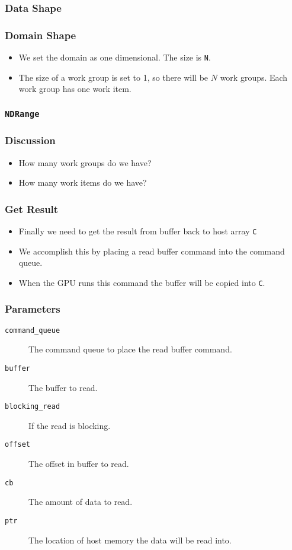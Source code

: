 \documentclass{beamer}
\begin{document}
\begin{frame}
  \frametitle{Data Shape}
\end{frame}

\begin{frame}
  \frametitle{Domain Shape}
  \begin{itemize}
  \item We set the domain as one dimensional.  The size is {\tt N}.
  \item The size of a work group is set to 1, so there will be $N$
    work groups.  Each work group has one work item.
  \end{itemize}
\end{frame}

\begin{frame}
  \frametitle{\tt NDRange}
  \centerline{}
\end{frame}

\begin{frame}
  \frametitle{Discussion}
  \begin{itemize}
    \item How many work groups do we have?
    \item How many work items do we have?
  \end{itemize}
\end{frame}

\begin{frame}
  \frametitle{Get Result}
  \begin{itemize}
  \item Finally we need to get the result from buffer back to host
    array {\tt C}
  \item We accomplish this by placing a read buffer command into the
    command queue.  
  \item When the GPU runs this command the buffer will be copied
    into {\tt C}.
  \end{itemize}
\end{frame}

\begin{frame}
\end{frame}

\begin{frame}
  \frametitle{Parameters}
  \begin{description}
  \item [\tt command\_queue] The command queue to place the read
    buffer command.
  \item [\tt buffer] The buffer to read.
  \item [\tt blocking\_read] If the read is blocking.
  \item [\tt offset] The offset in buffer to read.
  \item [\tt cb] The amount of data to read.
  \item [\tt ptr] The location of host memory the data will be read
    into.
  \end{description}
\end{frame}
\end{document}

